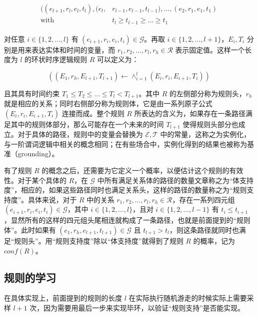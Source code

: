 \documentclass[a4paper, AutoFakeBold]{article}
\begin{document}
\begin{equation}
	\begin{aligned}
		\begin{split}
			((e_{l+1},r_l,e_l,t_l),(e_l, & r_{l-1}, e_{l-1}, t_{l-1}),\dots,(e_2, r_1, e_1, t_1)\\ 
			\text{with}\ & t_l\ge t_{l-1}\ge \dots\ge t_1
		\end{split}
	\end{aligned}
\end{equation}

对任意 $i\in\{1,2,\dots,l\}$ 有 $(e_{i+1},r_i,e_i,t_i)\in{\mathcal G}$。再取 $i\in\{1,2,\dots,l+1\}$，$E_i, T_i$ 分别是用来表达实体和时间的变量，而 $r_1, r_2,\dots,r_l,r_h\in{\mathcal R}$ 表示固定值。这样一个长度为 $l$ 的环状时序逻辑规则 $R$ 可以定义为：

\begin{equation}
	((E_1, r_h, E_{l+1}, T_{l+1})\leftarrow\wedge_{i=1}^l(E_i, r_i, E_{i+1}, T_i))
\end{equation}

且其具有时间约束 $T_1\le T_2\le\dots\le T_l< T_{l+1}$。其中 $R$ 的左侧部分称为规则头，$r_h$ 就是相应的关系；同时右侧部分称为规则体，它是由一系列原子公式 $(E_i,r_i,E_{i+1},T_i)$ 连接而成。整个规则 $R$ 所表达的含义为，如果存在一条路径满足其中的规则体部分，那么可能存在一个未来的时间 $T_{l+1}$ 使得规则头部分也成立。对于具体的路径，规则中的变量会替换为 ${\mathcal E},{\mathcal T}$ 中的常量，这称之为实例化，与一阶谓词逻辑中相关的概念相同；在有些场合中，实例化得到的结果也被称为基准（grounding）。

有了规则 $R$ 的概念之后，还需要为它定义一个概率，以便估计这个规则的有效性。对于某个具体的 $R$，在 ${\mathcal G}$ 中所有满足关系体的路径的数量文章称之为“体支持度”，相应的，如果这些路径同时也满足关系头，这样的路径的数量称之为“规则支持度”。具体来说，对于 $R$ 中的关系 $r_1, r_2,\dots,r_l,r_h\in{\mathcal R}$，存在一系列四元组 $(e_{i+1},r_i,e_i,t_i)\in{\mathcal G}$，其中 $i\in\{1,2,\dots,l\}$，且对 $i\in\{1,2,\dots,l-1\}$ 有 $t_i\le t_{i+1}$，显然所有的这样的四元组头尾相连就构成了一条路径，也就是前面提到的“规则体”。此时如果有 $(e_1,r_h,e_{l+1},t_{l+1})\in{\mathcal G}$ 且 $t_{l+1}>t_l$，则这条路径就同时也满足“规则头”。用“规则支持度”除以“体支持度”就得到了规则 $R$ 的概率，记为 $conf(R)$。

\subsection{规则的学习}

在具体实现上，前面提到的规则的长度 $l$ 在实际执行随机游走的时候实际上需要采样 $l+1$ 次，因为需要用最后一步来实现毕环，以验证“规则支持”是否能实现。
\end{document}
